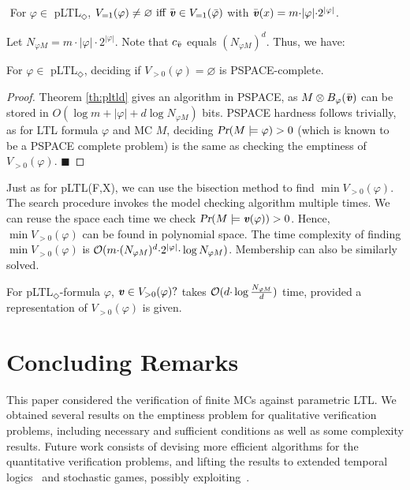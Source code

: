 \documentclass{llncs}
\renewcommand{\Pr}{\mbox{\rm Pr}}
\renewcommand{\Pr}{\mbox{\sl Pr}}
\renewcommand{\emptyset}{\varnothing}
\renewcommand{\a}[1]{\textbf{\textit{#1}}}
\newcommand{\ve}{{{\a v}}}
\newcommand{\de}{\Diamond}
\begin{document}
\begin{theorem}
$\!\!\!\!$
For $\varphi\in$ pLTL$_\de$, $V_{= 1}(\varphi) \neq \emptyset \mbox{ iff } \bar{ {\a v}} \in V_{= 1}(\bar\varphi)$ with $\bar{ {\a v}}(x) = m{\cdot}|\varphi|{\cdot}2^{|\varphi|}$.
\end{theorem}
\noindent
Let $N_{\varphi M} = m{\cdot}|\varphi|{\cdot}2^{|\varphi|}$.
Note that $c_{\bar \ve}$ equals $(N_{\varphi M})^d$. 
Thus, we have:

\begin{proposition}
 For $\varphi \in $ pLTL$_\de$, deciding if $V_{>0}(\varphi) = \emptyset$ is PSPACE-complete.
\end{proposition}
\begin{proof}
Theorem \ref{th:pltld} gives an algorithm in PSPACE, as $M\otimes B_\varphi(\bar\ve)$ can be stored in $O(\log m + |\varphi| + d\log N_{\varphi M})$ bits. 
PSPACE hardness follows trivially, as for LTL formula $\varphi$ and MC $M$, deciding $\Pr(M\models \varphi)> 0$ (which is known to be a PSPACE complete problem) is the same as checking the emptiness of $V_{>0}(\varphi)$.  \hfill $\blacksquare$
\end{proof}

Just as for pLTL(F,X), we can use the bisection method to find $\min V_{>0}(\varphi)$. The search procedure invokes the model checking algorithm
multiple times. We can reuse the space each time we check $\Pr(M\models\ve(\varphi))>0$.
Hence, $\min V_{>0}(\varphi)$ can be found in polynomial space. 
The time complexity of finding $\min V_{>0}(\varphi)$ is ${\cal O}(m{\cdot}(N_{\varphi M})^d{\cdot}2^{|\varphi|}{\cdot}\log N_{\varphi M})$. 
Membership can also be similarly solved.
\begin{proposition}
For pLTL$_\de$-formula $\varphi$, $\ve \in V_{>0}(\varphi)?$ takes ${\cal O}(d{\cdot} \log \frac{N_{\varphi M}}{d})$ time, provided a 
representation of $V_{>0}(\varphi)$ is given.  
\end{proposition}

\section{Concluding Remarks}
\label{sec:concl}

This paper considered the verification of finite MCs against parametric LTL. 
We obtained several results on the emptiness problem for qualitative verification problems, including
necessary and sufficient conditions as well as some complexity results.
Future work consists of devising more efficient algorithms for the quantitative verification problems, and lifting the results to extended temporal logics~\cite{Vardi94reasoningabout} and stochastic games, possibly exploiting~\cite{DBLP:journals/tcs/Zimmermann13}.
\end{document}

